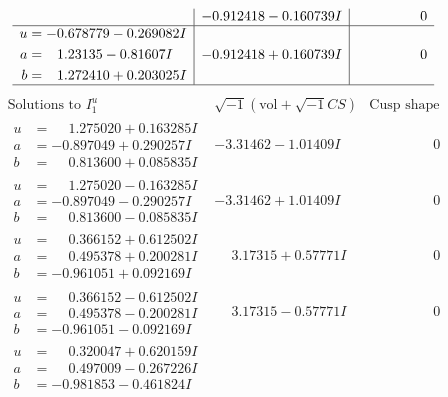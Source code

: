 \documentclass[1p]{elsarticle_modified}
\theoremstyle{definition}
\newcommand{\I}{\sqrt{-1}}
\begin{document}
$$\begin{array}{c|c|c}
 & -0.912418 - 0.160739 I & \phantom{-0.000000 } 0 \\ \hline\begin{aligned}
u &= -0.678779 - 0.269082 I \\
a &= \phantom{-}1.23135 - 0.81607 I \\
b &= \phantom{-}1.272410 + 0.203025 I\end{aligned}
 & -0.912418 + 0.160739 I & \phantom{-0.000000 } 0\\
 \hline 
 \end{array}$$\newpage$$\begin{array}{c|c|c}  
\text{Solutions to }I^u_{1}& \I (\text{vol} + \sqrt{-1}CS) & \text{Cusp shape}\\
 \hline 
\begin{aligned}
u &= \phantom{-}1.275020 + 0.163285 I \\
a &= -0.897049 + 0.290257 I \\
b &= \phantom{-}0.813600 + 0.085835 I\end{aligned}
 & -3.31462 - 1.01409 I & \phantom{-0.000000 } 0 \\ \hline\begin{aligned}
u &= \phantom{-}1.275020 - 0.163285 I \\
a &= -0.897049 - 0.290257 I \\
b &= \phantom{-}0.813600 - 0.085835 I\end{aligned}
 & -3.31462 + 1.01409 I & \phantom{-0.000000 } 0 \\ \hline\begin{aligned}
u &= \phantom{-}0.366152 + 0.612502 I \\
a &= \phantom{-}0.495378 + 0.200281 I \\
b &= -0.961051 + 0.092169 I\end{aligned}
 & \phantom{-}3.17315 + 0.57771 I & \phantom{-0.000000 } 0 \\ \hline\begin{aligned}
u &= \phantom{-}0.366152 - 0.612502 I \\
a &= \phantom{-}0.495378 - 0.200281 I \\
b &= -0.961051 - 0.092169 I\end{aligned}
 & \phantom{-}3.17315 - 0.57771 I & \phantom{-0.000000 } 0 \\ \hline\begin{aligned}
u &= \phantom{-}0.320047 + 0.620159 I \\
a &= \phantom{-}0.497009 - 0.267226 I \\
b &= -0.981853 - 0.461824 I\end{aligned}

\end{array}$$
\end{document}
